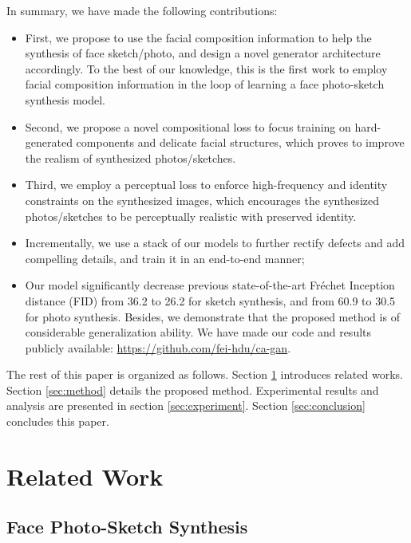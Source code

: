 \documentclass[journal]{IEEEtran}
\begin{document}
In summary, we have made the following contributions: 
\begin{itemize}
\item First, we propose to use the facial composition information to help the synthesis of face sketch/photo, and design a novel generator architecture accordingly. To the best of our knowledge, this is the first work to employ facial composition information in the loop of learning a face photo-sketch synthesis model.
\item Second, we propose a novel compositional loss to focus training on hard-generated components and delicate facial structures, which proves to improve the realism of synthesized photos/sketches. 
\item Third, we employ a perceptual loss to enforce high-frequency and identity constraints on the synthesized images, which encourages the synthesized photos/sketches to be perceptually realistic with preserved identity.
\item Incrementally, we use a stack of our models to further rectify defects and add compelling details, and train it in an end-to-end manner;
\item Our model significantly decrease previous state-of-the-art Fr\'{e}chet Inception distance (FID) from 36.2 to 26.2 for sketch synthesis, and from 60.9 to 30.5 for photo synthesis. Besides, we demonstrate that the proposed method is of considerable generalization ability. We have made our code and results publicly available: \url{https://github.com/fei-hdu/ca-gan}.
\end{itemize}

The rest of this paper is organized as follows. Section \ref{sec:related} introduces related works. Section \ref{sec:method} details the proposed method. Experimental results and analysis are presented in section \ref{sec:experiment}. Section \ref{sec:conclusion} concludes this paper.



\section{Related Work}
\label{sec:related}

\subsection{Face Photo-Sketch Synthesis}
\label{sec:fss}
\end{document}
